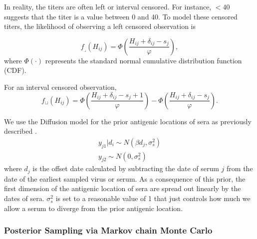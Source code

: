 \documentclass[11pt,oneside,letterpaper]{article}
\newcommand{\se}{s}									%
\newcommand{\threshold}{f_{\textstyle \lrcorner}}	%
\newcommand{\interval}{f_{\sqcup}}					%
\newcommand{\mdssd}{\varphi}						%
\begin{document}
In reality, the titers are often left or interval censored. For instance, $<40$ suggests that the titer is a value between 0 and 40. To model these censored titers, the likelihood of observing a left censored observation is 

\begin{equation} 
	\threshold(H_{ij}) = \Phi \left( \frac{ H_{ij} + \delta_{ij} - \se_j }{ \mdssd } \right),
\end{equation}
where $\Phi(\cdot)$ represents the standard normal cumulative distribution function (CDF).

For an interval censored observation,
\begin{equation} 
	\interval(H_{ij}) = \Phi \left( \frac{ H_{ij} + \delta_{ij} - \se_j + 1 }{ \mdssd } \right) - \Phi \left( \frac{ H_{ij} + \delta_{ij} - \se_j }{\mdssd} \right).
\end{equation}



We use the Diffusion model for the prior antigenic locations of sera as previously described \cite{bedford_integrating_2014}. 
\begin{eqnarray}
	y_{j1} | d_i \sim N ( \beta d_j, \sigma^2_s )  \\
	y_{j2}  \sim N(0, \sigma^2_s)
\end{eqnarray}
where $d_j$ is the offset date calculated by subtracting the date of serum $j$ from the date of the earliest sampled virus or serum. 
As a consequence of this prior, the first dimension of the antigenic location of sera are spread out linearly by the dates of sera. 
$\sigma^2_s$ is set to a reasonable value of 1 that just controls how much we allow a serum to diverge from the prior antigenic location.








\subsubsection*{Posterior Sampling via Markov chain Monte Carlo}
\end{document}
